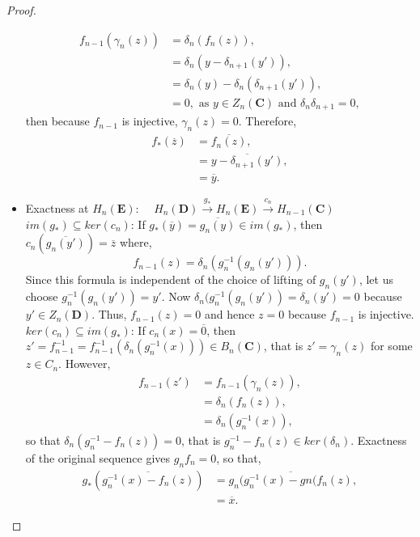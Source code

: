 \documentclass[11.5pt, twoside, a4paper, titlepage]{report}
\theoremstyle{definition}
\theoremstyle{plain}
\begin{document}
\begin{proof}
\begin{itemize}
\begin{align*}
f_{n-1}(\gamma_n(z))&=\delta_n(f_n(z)), \\
&=\delta_n(y-\delta_{n+1}(y')), \\
&=\delta_n(y)-\delta_n(\delta_{n+1}(y')), \\
&=0, \text{ as } y\in Z_n(\mathbf{C})\text{ and } \delta_n\delta_{n+1}=0,
\end{align*}
then because $f_{n-1}$ is injective, $\gamma_n(z)=0$. Therefore, 
\begin{align*}
f_{\ast}(\overline{z})&=\overline{f_n(z)}, \\
&=\overline{y-\delta_{n+1}(y')}, \\
&=\overline{y}.
\end{align*}
\item Exactness at $H_n(\mathbf{E})$: $\quad H_n(\mathbf{D}) \xrightarrow{g_{\ast}} H_n(\mathbf{E}) \xrightarrow{c_n} H_{n-1}(\mathbf{C})$\\
$im(g_{\ast})\subseteq ker(c_n)$: If $g_{\ast}(\overline{y})=\overline{g_n(y)} \in im(g_{\ast})$, then $c_n(\overline{g_n(y')})=\overline{z}$ where, 
\begin{equation*}
f_{n-1}(z)=\delta_n(g_n^{-1}(g_n(y'))).
\end{equation*}
Since this formula is independent of the choice of lifting of $g_n(y')$, let us choose $g_n^{-1}(g_n(y'))=y'$. Now $\delta_n(g^{-1}_n(g_n(y'))=\delta_n(y')=0$ because $y'\in Z_n(\mathbf{D})$. Thus, $f_{n-1}(z)=0$ and hence $z=0$ because $f_{n-1}$ is injective. \\
$ker(c_n)\subseteq im(g_{\ast})$: If $c_n(x)=\overline{0}$, then $z'=f_{n-1}^{-1}=f_{n-1}^{-1}(\delta_n(g_n^{-1}(x)))\in B_n(\mathbf{C})$, that is $z'=\gamma_n(z)$ for some $z\in C_n$. However, 
\begin{align*}
f_{n-1}(z')&=f_{n-1}(\gamma_n(z)), \\
&=\delta_n(f_n(z)), \\
&=\delta_n(g^{-1}_n(x)), 
\end{align*}
so that $\delta_n(g_n^{-1}-f_n(z))=0$, that is $g_n^{-1}-f_n(z) \in ker(\delta_n)$. Exactness of the original sequence gives $g_nf_n=0$, so that,
\begin{align*}
g_{\ast}(\overline{g_n^{-1}(x)-f_n(z)})&=\overline{g_n(g_n^{-1}(x)-gn(f_n(z)}, \\
&=\overline{x}.
\end{align*}
\end{itemize}
\end{proof}
\end{document}
